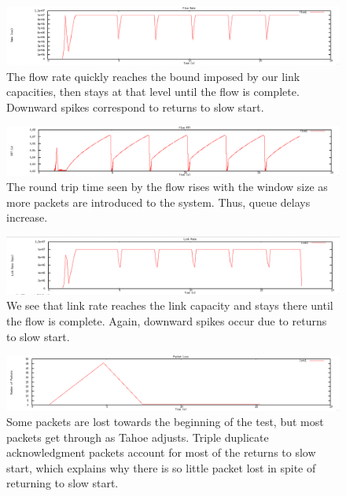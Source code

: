 \documentclass[12pt]{article}
\begin{document}
\begin{figure}[!ht]
\centering \includegraphics[bb= 0 0 1300 250, scale=.35]{figures/Test0_Tahoe/flow_rate.png}
\caption{The flow rate quickly reaches the bound imposed by our link capacities, then stays at that level until the flow is complete. Downward spikes correspond to returns to slow start.}
\label{fig:test0_tahoe_flow_rate}
\end{figure}

\begin{figure}[!ht]
\centering \includegraphics[bb= 0 0 1300 250, scale=.35]{figures/Test0_Tahoe/flow_rtt.png}
\caption{The round trip time seen by the flow rises with the window size as more packets are introduced to the system.  Thus, queue delays increase.}
\label{fig:test0_tahoe_flow_rtt}
\end{figure}

\begin{figure}[!ht]
\centering \includegraphics[bb= 0 0 1300 250, scale=.35]{figures/Test0_Tahoe/link_rate.png}
\caption{We see that link rate reaches the link capacity and stays there until the flow is complete. Again, downward spikes occur due to returns to slow start.}
\label{fig:test0_tahoe_link_rate}
\end{figure}

\begin{figure}[!ht]
\centering \includegraphics[bb= 0 0 1300 250, scale=.35]{figures/Test0_Tahoe/packet_loss.png}
\caption{Some packets are lost towards the beginning of the test, but most packets get through as Tahoe adjusts. Triple duplicate acknowledgment packets account for most of the returns to slow start, which explains why there is so little packet lost in spite of returning to slow start.}
\label{fig:test0_tahoe_packet_loss}
\end{figure}
\end{document}
